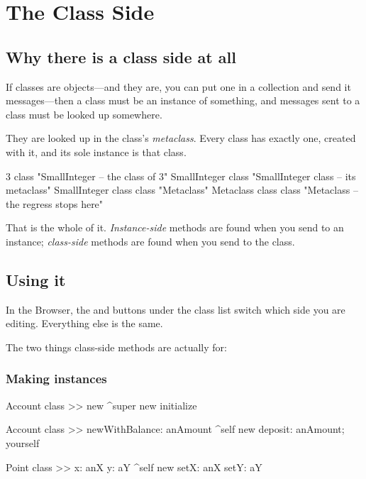 \chapter{The Class Side}
\label{ch:classside}


\section{Why there is a class side at all}

If classes are objects---and they are, you can put one in a collection and
send it messages---then a class must be an instance of something, and messages
sent to a class must be looked up somewhere.

They are looked up in the class's \emph{metaclass}. Every class has exactly
one, created with it, and its sole instance is that class.

\begin{st}
3 class                  "SmallInteger        -- the class of 3"
SmallInteger class       "SmallInteger class  -- its metaclass"
SmallInteger class class "Metaclass"
Metaclass class class    "Metaclass -- the regress stops here"
\end{st}

That is the whole of it. \emph{Instance-side} methods are found when you send
to an instance; \emph{class-side} methods are found when you send to the
class.

\section{Using it}

In the Browser, the  and  buttons under the class list
switch which side you are editing. Everything else is the same.

The two things class-side methods are actually for:

\subsection{Making instances}

\begin{st}
Account class >> new
    ^super new initialize

Account class >> newWithBalance: anAmount
    ^self new deposit: anAmount; yourself

Point class >> x: anX y: aY
    ^self new setX: anX setY: aY
\end{st}

